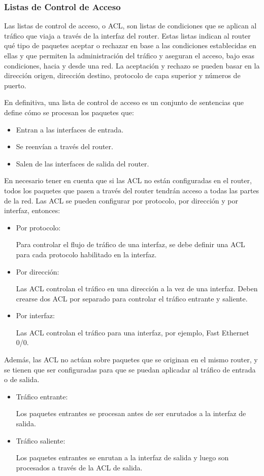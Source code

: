 \documentclass[a4paper,10pt]{article}
\begin{document}
\subsubsection{Listas de Control de Acceso}
Las listas de control de acceso, o ACL, son listas de condiciones que se aplican al tráfico que viaja a través de la interfaz del router.
Estas listas indican al router qué tipo de paquetes aceptar o rechazar en base a las condiciones establecidas en ellas y que permiten la administración del tráfico y aseguran el acceso, bajo esas condiciones, hacia y desde una red.
La aceptación y rechazo se pueden basar en la dirección origen, dirección destino, protocolo de capa superior y números de puerto.

En definitiva, una lista de control de acceso es un conjunto de sentencias que define cómo se procesan los paquetes que: 
\begin{itemize}
	\item Entran a las interfaces de entrada. 
    \item Se reenvían a través del router. 
    \item Salen de las interfaces de salida del router. 
\end{itemize}
    

En necesario tener en cuenta que si las ACL no están configuradas en el router, todos los paquetes que pasen a través del router tendrán acceso a todas las partes de la red.
Las ACL se pueden configurar por protocolo, por dirección y por interfaz, entonces: 
\begin{itemize}
	\item Por protocolo: 
	
	Para controlar el flujo de tráfico de una interfaz, se debe definir una ACL para cada protocolo habilitado en la interfaz. 
    \item Por dirección: 
    
    Las ACL controlan el tráfico en una dirección a la vez de una interfaz. Deben crearse dos ACL por separado para controlar el tráfico entrante y saliente. 
    \item Por interfaz: 
    
    Las ACL controlan el tráfico para una interfaz, por ejemplo, Fast Ethernet 0/0.
\end{itemize}
Además, las ACL no actúan sobre paquetes que se originan en el mismo router, y se tienen que ser configuradas para que se puedan aplicadar al tráfico de entrada o de salida.
\begin{itemize}
	\item Tráfico entrante: 
	
	Los paquetes entrantes se procesan antes de ser enrutados a la interfaz de salida. 
    \item Tráfico saliente:
    
    Los paquetes entrantes se enrutan a la interfaz de salida y luego son procesados a través de la ACL de salida. 
\end{itemize}
    
\end{document}
